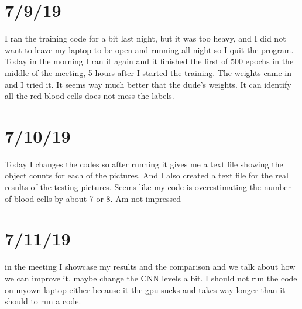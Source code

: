 \documentclass{article}
\begin{document}
\section{7/9/19}
I ran the training code for a bit last night, but it was too heavy, and I did not want to leave my laptop to be open and running all night so I quit the program. Today in the morning I ran it again and it finished the first of 500 epochs in the middle of the meeting, 5 hours after I started the training. The weights came in and I tried it. It seems way much better that the dude’s weights. It can identify all the red blood cells does not mess the labels.

\section{7/10/19}
Today I changes the codes so after running it gives me a text file showing the object counts for each of the pictures. And I also created a text file for the real results of the testing pictures. Seems like my code is overestimating the number of blood cells by about 7 or 8. Am not impressed

\section{7/11/19}
in the meeting I showcase my results and the comparison and we talk about how we can improve it. maybe change the CNN levels a bit. I should not run the code on myown laptop either because it the gpu sucks and takes way longer than it should to run a code.
\end{document}
